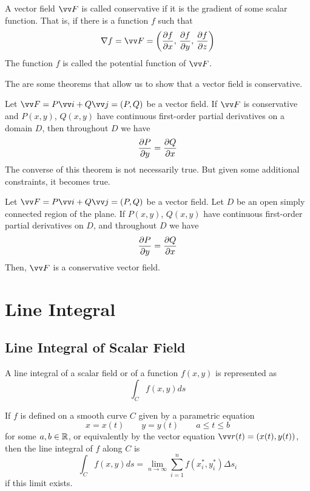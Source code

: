 \begin{definition}
A vector field $\vv F$ is called conservative if it is the gradient of some scalar function. That is, if there is a function $f$ such that
$$
\nabla f = \vv F = \left( \partialderiv{f}{x},\, \partialderiv{f}{y},\, \partialderiv{f}{z} \right)
$$
The function $f$ is called the potential function of $\vv F$.
\end{definition}

The are some theorems that allow us to show that a vector field is conservative.

\begin{theorem}
Let $\vv F = P\vv i + Q\vv j = (P,Q)$ be a vector field. If $\vv F$ is conservative and $P(x,y)$, $Q(x,y)$ have continuous first-order partial derivatives on a domain $D$, then throughout $D$ we have
$$
\frac{\partial P}{\partial y} = \frac{\partial Q}{\partial x}
$$
The converse of this theorem is not necessarily true. But given some additional constraints, it becomes true.
\end{theorem}

\begin{theorem}
Let $\vv F = P\vv i + Q\vv j = (P,Q)$ be a vector field. Let $D$ be an open simply connected region of the plane. If $P(x,y)$, $Q(x,y)$ have continuous first-order partial derivatives on $D$, and throughout $D$ we have
$$
\frac{\partial P}{\partial y} = \frac{\partial Q}{\partial x}
$$
Then, $\vv F$ is a conservative vector field.
\end{theorem}

\section{Line Integral}

\subsection{Line Integral of Scalar Field}

A line integral of a scalar field or of a function $f(x,y)$ is represented as
$$
\int_C f(x,y) ds
$$


\begin{definition}

If $f$ is defined on a smooth curve $C$ given by a parametric equation
$$
x = x(t) \qquad y = y(t) \qquad a \leq t \leq b
$$
for some $a,b \in {\mathbb R}$, or equivalently by the vector equation $\vv r(t)=(x(t),y(t))$, then the line integral of $f$ along $C$ is
$$
\int_C f(x,y) ds = \lim_{n\to\infty} \sum_{i=1}^n f(x_i^*, y_i^*) \Delta s_i
$$
if this limit exists.
\end{definition}

